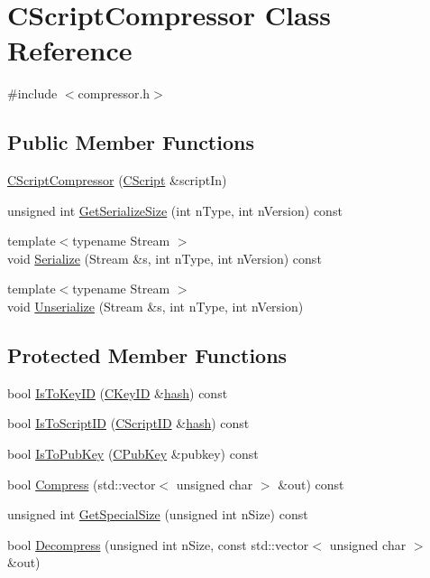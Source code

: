 \hypertarget{class_c_script_compressor}{}\section{C\+Script\+Compressor Class Reference}
\label{class_c_script_compressor}


{\ttfamily \#include $<$compressor.\+h$>$}

\subsection*{Public Member Functions}
\begin{DoxyCompactItemize}
\item 
\hyperlink{class_c_script_compressor_aad31afe3d14387b163b5c043e834ca2b}{C\+Script\+Compressor} (\hyperlink{class_c_script}{C\+Script} \&script\+In)
\item 
unsigned int \hyperlink{class_c_script_compressor_a3b3dd61547c3dc2f7ba9325f74b9ec5f}{Get\+Serialize\+Size} (int n\+Type, int n\+Version) const 
\item 
{\footnotesize template$<$typename Stream $>$ }\\void \hyperlink{class_c_script_compressor_a9d8168293e0a6d0fd8c4aeb63a346525}{Serialize} (Stream \&s, int n\+Type, int n\+Version) const 
\item 
{\footnotesize template$<$typename Stream $>$ }\\void \hyperlink{class_c_script_compressor_a016fa6e3d2735d95fcf773271da073d5}{Unserialize} (Stream \&s, int n\+Type, int n\+Version)
\end{DoxyCompactItemize}
\subsection*{Protected Member Functions}
\begin{DoxyCompactItemize}
\item 
bool \hyperlink{class_c_script_compressor_a13afc45e3a0a8a3d634cfafba9b2a040}{Is\+To\+Key\+I\+D} (\hyperlink{class_c_key_i_d}{C\+Key\+I\+D} \&\hyperlink{cache_8cc_a11ecb029164e055f28f4123ce3748862}{hash}) const 
\item 
bool \hyperlink{class_c_script_compressor_a6da015ff028139ef52e7376166b04928}{Is\+To\+Script\+I\+D} (\hyperlink{class_c_script_i_d}{C\+Script\+I\+D} \&\hyperlink{cache_8cc_a11ecb029164e055f28f4123ce3748862}{hash}) const 
\item 
bool \hyperlink{class_c_script_compressor_a4cec58b09c4ab7873b5884ed690ed0f9}{Is\+To\+Pub\+Key} (\hyperlink{class_c_pub_key}{C\+Pub\+Key} \&pubkey) const 
\item 
bool \hyperlink{class_c_script_compressor_a98cb19f185efc85a395a5332574ef56b}{Compress} (std\+::vector$<$ unsigned char $>$ \&out) const 
\item 
unsigned int \hyperlink{class_c_script_compressor_a0e4f4c405f4a937c95fd4270db4d7d66}{Get\+Special\+Size} (unsigned int n\+Size) const 
\item 
bool \hyperlink{class_c_script_compressor_a1feb663ddab3a45218c7cb02f2a25717}{Decompress} (unsigned int n\+Size, const std\+::vector$<$ unsigned char $>$ \&out)
\end{DoxyCompactItemize}


